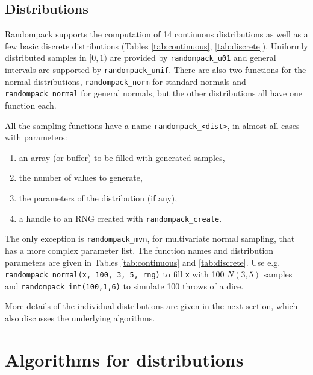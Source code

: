 \documentclass[manuscript,screen,review]{acmart}
\begin{document}
\subsection{Distributions}
Randompack supports the computation of 14 continuous distributions as
well as a few basic discrete distributions (Tables
\ref{tab:continuous}, \ref{tab:discrete}). Uniformly distributed
samples in $[0,1)$ are provided by \texttt{randompack\_u01} and
general intervals are supported by \texttt{randompack\_unif}. There
are also two functions for the normal distributions,
\texttt{randompack\_norm} for standard normals and
\texttt{randompack\_normal} for general normals, but the other
distributions all have one function each.

All the sampling functions have a name \texttt{randompack\_<dist>}, in
almost all cases with parameters:
%
\begin{samepage}
\begin{enumerate}
\item an array (or buffer) to be filled with generated samples,
\item the number of values to generate,
\item the parameters of the distribution (if any),
\item a handle to an RNG created with \texttt{randompack\_create}.
\end{enumerate}
\end{samepage}
%
The only exception is \texttt{randompack\_mvn}, for multivariate
normal sampling, that has a more complex parameter list. The function
names and distribution parameters are given in Tables
\ref{tab:continuous} and \ref{tab:discrete}. Use e.g.
\texttt{randompack\_normal(x, 100, 3, 5, rng)} to fill \texttt{x} with
100 $N(3,5)$ samples and \texttt{randompack\_int(100,1,6)} to simulate
100 throws of a dice.

More details of the individual distributions are given in the next
section, which also discusses the underlying algorithms.

\section{Algorithms for distributions}
\end{document}
